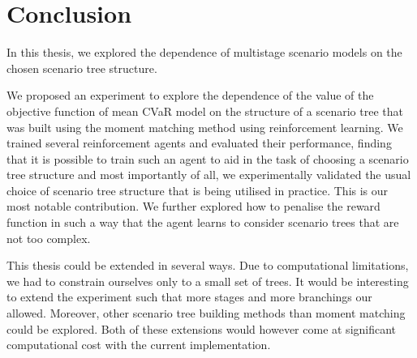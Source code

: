 \chapter*{Conclusion}
In this thesis, we explored the dependence of multistage scenario models on the chosen scenario tree structure.

We proposed an experiment to explore the dependence of the value of the objective function of mean CVaR model on the structure of a scenario tree that was built using the moment matching method using reinforcement learning. We trained several reinforcement agents and evaluated their performance, finding that it is possible to train such an agent to aid in the task of choosing a scenario tree structure and most importantly of all, we experimentally validated the usual choice of scenario tree structure that is being utilised in practice. This is our most notable contribution. We further explored how to penalise the reward function in such a way that the agent learns to consider scenario trees that are not too complex.

This thesis could be extended in several ways. Due to computational limitations, we had to constrain ourselves only to a small set of trees. It would be interesting to extend the experiment such that more stages and more branchings our allowed. Moreover, other scenario tree building methods than moment matching could be explored. Both of these extensions would however come at significant computational cost with the current implementation.